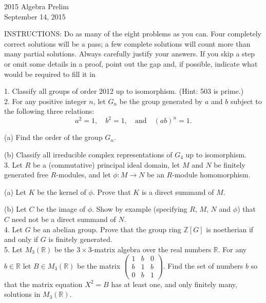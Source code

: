\documentclass[11pt]{article}
\newcommand{\Z}{\mathbb{Z}}
\newcommand{\R}{\mathbb{R}}
\begin{document}
\begin{center}
\Large 2015 Algebra Prelim\\
\normalsize September 14, 2015
\end{center}
\vspace{1em}

INSTRUCTIONS: Do as many of the eight problems as you can. Four completely
correct solutions will be a pass; a few complete solutions will count more than many
partial solutions. Always carefully justify your answers. If you skip a step or omit
some details in a proof, point out the gap and, if possible, indicate what would be
required to fill it in\\
\vspace{1em}

1. Classify all groups of order 2012 up to isomorphism. (Hint: 503 is prime.)\\


2. For any positive integer $n$, let $G_n$ be the group generated by $a$ and $b$ subject to the following three
relations:\[
a^2=1,\quad b^2=1,\quad\text{and}\quad (ab)^n=1.
\]

(a) Find the order of the group $G_n$.

(b) Classify all irreducible complex representations of $G_4$ up to isomorphism.\\

3. Let $R$ be a (commutative) principal ideal domain, let $M$ and $N$ be finitely generated free $R$-modules,
and let $\phi : M \to N$ be an $R$-module homomorphism.

(a) Let $K$ be the kernel of $\phi$. Prove that $K$ is a direct summand of $M$.

(b) Let $C$ be the image of $\phi$. Show by example (specifying $R$, $M$, $N$ and $\phi$) that $C$ need not be a direct summand of $N$.\\

4. Let $G$ be an abelian group. Prove that the group ring $\Z[G]$ is noetherian if and only if $G$ is finitely
generated.\\

5. Let $M_3(\R)$ be the $3\times 3$-matrix algebra over the real numbers $\R$. For any $b\in \R$ let $B\in M_3(\R)$ be the matrix $\begin{pmatrix}1&b&0\\b&1&b\\0&b&1\end{pmatrix}$. Find the set of numbers $b$ so that the matrix equation $X^2 = B$ has at least one, and only finitely many, solutions in $M_3(\R)$. \\
\end{document}
